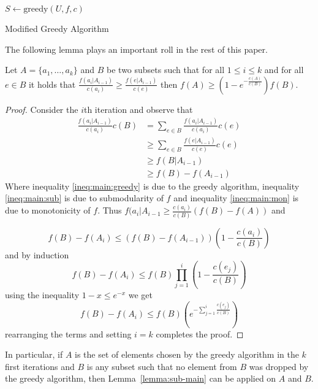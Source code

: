 \begin{algorithm}[H]
\label{alg:mgreedy}



$S \leftarrow \text{greedy}(U, f, c)$
\\
\caption{Modified Greedy Algorithm}
\end{algorithm}

The following lemma plays an important roll in the rest of this paper.

\begin{lemma}
\label{lemma:sub-main}
Let $A = \{a_1, \dots, a_k\}$ and $B$ be two subsets such that for all $1 \leq i \leq k$ 
and for all $e \in B$ it holds that 
$\frac{f(a_i|A_{i-1})}{c(a_i)} \geq \frac{f(e|A_{i-1})}{c(e)}$
then $f(A) \geq (1 - e^{-\frac{c(A)}{c(B)}})f(B)$.
\end{lemma} 

\begin{proof}
Consider the $i$th iteration and observe that 
\begin{align}
	\frac{f(a_i|A_{i-1})}{c(a_i)}c(B) 
	& = \sum_{e \in B} \frac{f(a_i|A_{i-1})}{c(a_i)}c(e)
	\label{ineq:main:greedy}
	\\ 	& \geq \sum_{e \in B} \frac{f(e|A_{i-1})}{c(e)}c(e)
	\label{ineq:main:sub}
	\\	& \geq f(B|A_{i-1})
	\label{ineq:main:mon}
	\\ 	& \geq f(B) - f(A_{i-1})
\end{align}
Where inequality \ref{ineq:main:greedy} is due to the greedy algorithm, inequality \ref{ineq:main:sub} is due to submodularity of $f$ and inequality \ref{ineq:main:mon} is due to monotonicity of $f$.
Thus $f(a_i|A_{i-1} \geq \frac{c(a_i)}{c(B)}(f(B) - f(A))$ and

$$
f(B) - f(A_i)  \leq (f(B) - f(A_{i - 1}))(1 - \frac{c(a_i)}{c(B)})
$$
and by induction
$$
f(B) - f(A_i)  \leq f(B) \prod_{j = 1}^{i}(1 - \frac{c(e_j)}{c(B)})
$$
using the inequality $1 - x \leq e^{-x}$ we get
$$
f(B) - f(A_i)  \leq f(B) (e^{-\sum_{j = 1}^{i}\frac{c(e_j)}{c(B)}})
$$
rearranging the terms and setting $i = k$ completes the proof.
\end{proof}

In particular, if $A$ is the set of elements chosen by the greedy algorithm in 
the $k$ first iterations and $B$ is any subset such that no element from $B$ was dropped
by the greedy algorithm, 
then Lemma~\ref{lemma:sub-main} can be applied on $A$ and $B$.   




